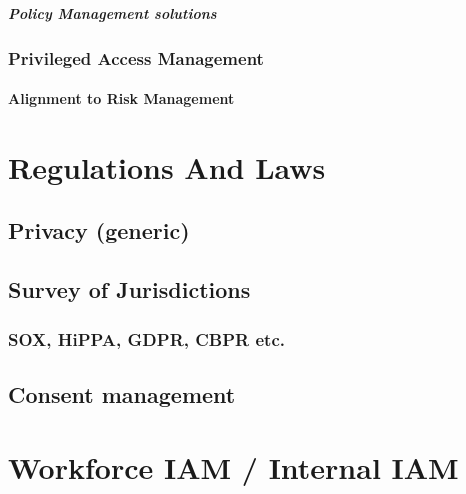\hypertarget{policy-management-solutions}{%
\paragraph{Policy Management
solutions}\label{policy-management-solutions}}

\hypertarget{privileged-access-management}{%
\subsection{Privileged Access
Management}\label{privileged-access-management}}

\hypertarget{alignment-to-risk-management}{%
\subsubsection{Alignment to Risk
Management}\label{alignment-to-risk-management}}

\hypertarget{regulations-and-laws}{%
\chapter{Regulations And Laws}\label{regulations-and-laws}}

\hypertarget{privacy-generic}{%
\section{Privacy (generic)}\label{privacy-generic}}

\hypertarget{survey-of-jurisdictions}{%
\section{Survey of Jurisdictions}\label{survey-of-jurisdictions}}

\hypertarget{sox-hippa-gdpr-cbpr-etc.}{%
\subsection{SOX, HiPPA, GDPR, CBPR
etc.}\label{sox-hippa-gdpr-cbpr-etc.}}

\hypertarget{consent-management}{%
\section{Consent management}\label{consent-management}}

\hypertarget{workforce-iam-internal-iam}{%
\chapter{Workforce IAM / Internal
IAM}\label{workforce-iam-internal-iam}}

